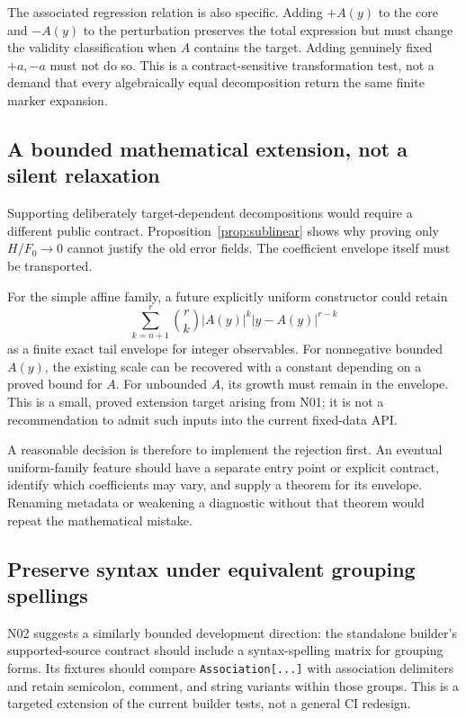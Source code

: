 \documentclass[11pt,letterpaper]{article}
\newcommand{\code}[1]{\nolinkurl{#1}}
\begin{document}
The associated regression relation is also specific. Adding \(+A(y)\) to the core and \(-A(y)\) to the perturbation preserves the total expression but must change the validity classification when \(A\) contains the target. Adding genuinely fixed \(+a,-a\) must not do so. This is a contract-sensitive transformation test, not a demand that every algebraically equal decomposition return the same finite marker expansion.

\subsection{A bounded mathematical extension, not a silent relaxation}
Supporting deliberately target-dependent decompositions would require a different public contract. Proposition~\ref{prop:sublinear} shows why proving only \(H/F_0\to0\) cannot justify the old error fields. The coefficient envelope itself must be transported.

For the simple affine family, a future explicitly uniform constructor could retain
\[
 \sum_{k=n+1}^{r}\binom rk |A(y)|^k|y-A(y)|^{r-k}
\]
as a finite exact tail envelope for integer observables. For nonnegative bounded \(A(y)\), the existing scale can be recovered with a constant depending on a proved bound for \(A\). For unbounded \(A\), its growth must remain in the envelope. This is a small, proved extension target arising from N01; it is not a recommendation to admit such inputs into the current fixed-data API.

A reasonable decision is therefore to implement the rejection first. An eventual uniform-family feature should have a separate entry point or explicit contract, identify which coefficients may vary, and supply a theorem for its envelope. Renaming metadata or weakening a diagnostic without that theorem would repeat the mathematical mistake.

\subsection{Preserve syntax under equivalent grouping spellings}
N02 suggests a similarly bounded development direction: the standalone builder's supported-source contract should include a syntax-spelling matrix for grouping forms. Its fixtures should compare \code{Association[...]} with association delimiters and retain semicolon, comment, and string variants within those groups. This is a targeted extension of the current builder tests, not a general CI redesign.
\end{document}
